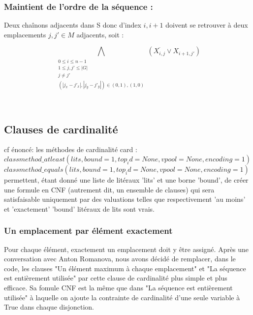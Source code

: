 \documentclass[utf8]{article}
\begin{document}
\subsubsection{Maintient de l'ordre de la séquence :}
Deux chaînons adjacents dans S donc d'index $i,i+1$  doivent se retrouver à deux emplacements $j,j' \in M$ adjacents, soit : \\

\begin{center}
    \[ \bigwedge_{\substack{0\leq i\leq n-1
    \\1\leq j,j'\leq |G|
    \\ j\neq j'
    \\(|j_x - j'_x|, |j_y - j'_y |) \in (0, 1), (1, 0)}}(\overline{X_{i,j}} \vee X_{i+1,j'}) \]
\end{center} \\

\subsection{Clauses de cardinalité}

cf énoncé: les méthodes de cardinalité card : \\
$classmethod\_atleast(lits, bound=1, top_id=None, vpool=None, encoding=1) $\\
$classmethod\_equals(lits, bound=1, top_id=None, vpool=None, encoding=1) $\\

permettent, étant donné une liste de litéraux 'lits' et une borne 'bound', de créer une formule en CNF (autrement dit, un ensemble de clauses) qui sera satisfaisable uniquement par des valuations telles que respectivement 'au moins' et 'exactement' 'bound' litéraux de lits sont vrais.

\subsubsection{Un emplacement par élément exactement}
Pour chaque élément, exactement un emplacement doit y être assigné.
Après une conversation avec Anton Romanova, nous avons décidé de remplacer, dans le code, les clauses "Un élément maximum à chaque emplacement" et "La séquence est entièrement utilisée" par cette clause de cardinalité plus simple et plus efficace. Sa fomule CNF est la même que dans "La séquence est entièrement utilisée" à laquelle on ajoute la contrainte de cardinalité d'une seule variable à True dans chaque disjonction.
\end{document}
